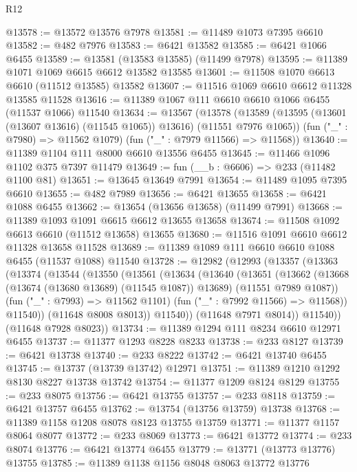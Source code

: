\begin{lexlean}{R12}
\begin{coremodule}
{{{{{{{{{{{{{{{{{{{{{{{{{{{{{{{{{{{{{{{{{{{{{{{{{{{{{{{{{{{{{{{{{{{{{{{{{{{{{{{{{{@13578 := @13572 @13576 @7978
@13581 := @11489 @1073 @7395 @6610
@13582 := @482 @7976
@13583 := @6421 @13582
@13585 := @6421 @1066 @6455
@13589 := @13581 (@13583 @13585) (@11499 @7978)
@13595 := @11389 @1071 @1069 @6615 @6612 @13582 @13585
@13601 := @11508 @1070 @6613 @6610 (@11512 @13585) @13582
@13607 := @11516 @1069 @6610 @6612 @11328 @13585 @11528
@13616 := @11389 @1067 @111 @6610 @6610 @1066 @6455 (@11537 @1066) @11540
@13634 := @13567
    (@13578
      (@13589 (@13595 (@13601 (@13607 @13616) (@11545 @1065)) @13616) (@11551 @7976 @1065))
      (fun ("_" : @7980) => @11562 @1079)
      (fun ("_" : @7979 @11566) => @11568))
@13640 := @11389 @1104 @111 @8000 @6610 @13556 @6455
@13645 := @11466 @1096 @1102 @375 @7397 @11479
@13649 := fun (__b : @6606) => @233 (@11482 @1100 @81)
@13651 := @13645 @13649 @7991
@13654 := @11489 @1095 @7395 @6610
@13655 := @482 @7989
@13656 := @6421 @13655
@13658 := @6421 @1088 @6455
@13662 := @13654 (@13656 @13658) (@11499 @7991)
@13668 := @11389 @1093 @1091 @6615 @6612 @13655 @13658
@13674 := @11508 @1092 @6613 @6610 (@11512 @13658) @13655
@13680 := @11516 @1091 @6610 @6612 @11328 @13658 @11528
@13689 := @11389 @1089 @111 @6610 @6610 @1088 @6455 (@11537 @1088) @11540
@13728 := @12982
    (@12993
      (@13357
        (@13363
          (@13374
            (@13544
              (@13550
                (@13561
                  (@13634
                    (@13640
                      (@13651
                        (@13662
                          (@13668 (@13674 (@13680 @13689) (@11545 @1087)) @13689)
                          (@11551 @7989 @1087))
                        (fun ("_" : @7993) => @11562 @1101)
                        (fun ("_" : @7992 @11566) => @11568))
                      @11540))
                  (@11648 @8008 @8013))
                @11540))
            (@11648 @7971 @8014))
          @11540))
      (@11648 @7928 @8023))
@13734 := @11389 @1294 @111 @8234 @6610 @12971 @6455
@13737 := @11377 @1293 @8228 @8233
@13738 := @233 @8127
@13739 := @6421 @13738
@13740 := @233 @8222
@13742 := @6421 @13740 @6455
@13745 := @13737 (@13739 @13742) @12971
@13751 := @11389 @1210 @1292 @8130 @8227 @13738 @13742
@13754 := @11377 @1209 @8124 @8129
@13755 := @233 @8075
@13756 := @6421 @13755
@13757 := @233 @8118
@13759 := @6421 @13757 @6455
@13762 := @13754 (@13756 @13759) @13738
@13768 := @11389 @1158 @1208 @8078 @8123 @13755 @13759
@13771 := @11377 @1157 @8064 @8077
@13772 := @233 @8069
@13773 := @6421 @13772
@13774 := @233 @8074
@13776 := @6421 @13774 @6455
@13779 := @13771 (@13773 @13776) @13755
@13785 := @11389 @1138 @1156 @8048 @8063 @13772 @13776
}}}}}}}}}}}}}}}}}}}}}}}}}}}}}}}}}}}}}}}}}}}}}}}}}}}}}}}}}}}}}}}}}}}}}}}}}}}}}}}}}}
\end{coremodule}
\end{lexlean}
